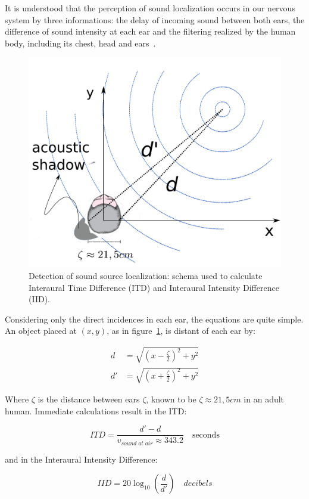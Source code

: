 \documentclass[
 aip,
 jmp,
 amsmath,amssymb,
 reprint,
]{revtex4-1}
\begin{document}
It is understood that the perception of sound localization occurs in our nervous system by three informations: the delay of incoming sound between both ears, the difference of sound intensity at each ear and the filtering realized by the human body, including its chest, head and ears~\cite{Roederer, hrtf, Heeger}. 

\begin{figure}[h!]
    \centering
        \includegraphics[width=.5\textwidth]{figures/espacializacao___}
    \caption{Detection of sound source localization: schema used to calculate Interaural Time Difference (ITD) and Interaural Intensity Difference (IID).}
    \label{fig:spac}
\end{figure}

Considering only the direct incidences in each ear, the equations are quite simple. An object placed at $(x,y)$, as in figure~\ref{fig:spac}, is distant of each ear by:

\begin{equation}\label{eq:distOuvidos}
\begin{split}
d & =\sqrt{\left (x-\frac{\zeta}{2} \right )^2+y^2} \\
d' & =\sqrt{\left (x+\frac{\zeta}{2} \right )^2 + y^2}
\end{split}
\end{equation}

Where $\zeta$ is the distance between ears $\zeta$,  known to be $\zeta \approx 21,5cm$ in an adult human.
Immediate calculations result in the ITD:

\begin{equation}\label{eq:dti}
ITD=\frac{d'-d}{v_{sound\;at\;air}\approx 343.2 }\quad \text{seconds}
\end{equation}

\noindent and in the Interaural Intensity Difference:

\begin{equation}\label{eq:dii}
IID=20\log_{10}\left (\frac{d}{d'}\right) \quad decibels
\end{equation}
\end{document}
